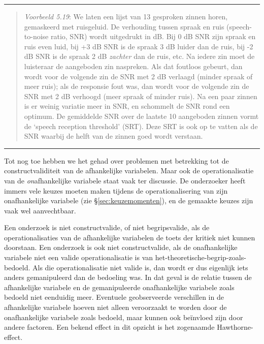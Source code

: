 \documentclass[
]{book}
\begin{document}
\begin{center}\rule{0.5\linewidth}{0.5pt}\end{center}

\begin{quote}
\emph{Voorbeeld 5.19}: We laten een lijst van 13
gesproken zinnen horen, gemaskeerd met ruisgeluid. De verhouding tussen
spraak en ruis (speech-to-noise ratio, SNR) wordt uitgedrukt in dB. Bij
0 dB SNR zijn spraak en ruis even luid, bij +3 dB SNR is de spraak 3 dB
luider dan de ruis, bij -2 dB SNR is de spraak 2 dB \emph{zachter} dan de
ruis, etc. Na iedere zin moet de luisteraar de aangeboden zin naspreken.
Als dat foutloos gebeurt, dan wordt voor de volgende zin de SNR met 2 dB
verlaagd (minder spraak of meer ruis); als de responsie fout was, dan
wordt voor de volgende zin de SNR met 2 dB verhoogd (meer spraak of
minder ruis). Na een paar zinnen is er weinig variatie meer in SNR, en
schommelt de SNR rond een optimum. De gemiddelde SNR over de laatste 10
aangeboden zinnen vormt de `speech reception threshold' (SRT). Deze SRT
is ook op te vatten als de SNR waarbij de helft van de zinnen goed wordt
verstaan.
\end{quote}

\begin{center}\rule{0.5\linewidth}{0.5pt}\end{center}

Tot nog toe hebben we het gehad over problemen met betrekking tot de
constructvaliditeit van de afhankelijke variabelen. Maar ook de
operationalisatie van de \emph{on}afhankelijke variabele staat vaak ter
discussie. De onderzoeker heeft immers vele keuzes moeten maken tijdens
de operationalisering van zijn onafhankelijke variabele (zie
§\ref{sec:keuzemomenten}), en de gemaakte keuzes zijn vaak wel
aanvechtbaar.

Een onderzoek is niet constructvalide, of niet begripsvalide, als de
operationalisaties van de afhankelijke variabelen de toets der kritiek
niet kunnen doorstaan. Een onderzoek is ook niet constructvalide, als de
onafhankelijke variabele niet een valide operationalisatie is van
het-theoretische-begrip-zoals-bedoeld. Als die operationalisatie niet
valide is, dan wordt er dus eigenlijk iets anders gemanipuleerd dan de
bedoeling was. In dat geval is de relatie tussen de afhankelijke
variabele en de gemanipuleerde onafhankelijke variabele zoals bedoeld
niet eenduidig meer. Eventuele geobserveerde verschillen in de
afhankelijke variabele hoeven niet alleen veroorzaakt te worden door de
onafhankelijke variabele zoals bedoeld, maar kunnen ook beïnvloed zijn
door andere factoren. Een bekend effect in dit opzicht is het zogenaamde
Hawthorne-effect.
\end{document}
